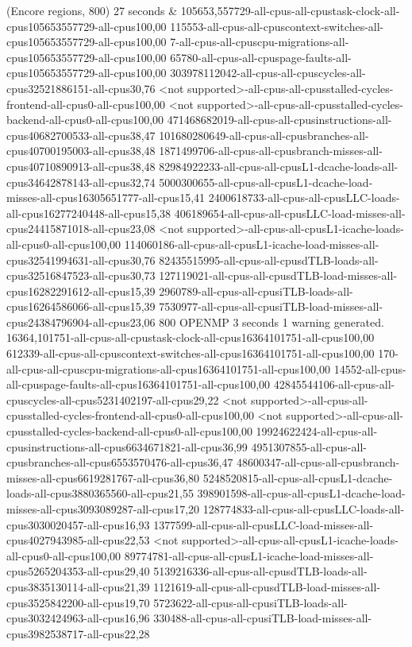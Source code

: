 (Encore regions, 800) 27 seconds
&
105653,557729-all-cpus-all-cpustask-clock-all-cpus105653557729-all-cpus100,00
115553-all-cpus-all-cpuscontext-switches-all-cpus105653557729-all-cpus100,00
7-all-cpus-all-cpuscpu-migrations-all-cpus105653557729-all-cpus100,00
65780-all-cpus-all-cpuspage-faults-all-cpus105653557729-all-cpus100,00
303978112042-all-cpus-all-cpuscycles-all-cpus32521886151-all-cpus30,76
<not supported>-all-cpus-all-cpusstalled-cycles-frontend-all-cpus0-all-cpus100,00
<not supported>-all-cpus-all-cpusstalled-cycles-backend-all-cpus0-all-cpus100,00
471468682019-all-cpus-all-cpusinstructions-all-cpus40682700533-all-cpus38,47
101680280649-all-cpus-all-cpusbranches-all-cpus40700195003-all-cpus38,48
1871499706-all-cpus-all-cpusbranch-misses-all-cpus40710890913-all-cpus38,48
82984922233-all-cpus-all-cpusL1-dcache-loads-all-cpus34642878143-all-cpus32,74
5000300655-all-cpus-all-cpusL1-dcache-load-misses-all-cpus16305651777-all-cpus15,41
2400618733-all-cpus-all-cpusLLC-loads-all-cpus16277240448-all-cpus15,38
406189654-all-cpus-all-cpusLLC-load-misses-all-cpus24415871018-all-cpus23,08
<not supported>-all-cpus-all-cpusL1-icache-loads-all-cpus0-all-cpus100,00
114060186-all-cpus-all-cpusL1-icache-load-misses-all-cpus32541994631-all-cpus30,76
82435515995-all-cpus-all-cpusdTLB-loads-all-cpus32516847523-all-cpus30,73
127119021-all-cpus-all-cpusdTLB-load-misses-all-cpus16282291612-all-cpus15,39
2960789-all-cpus-all-cpusiTLB-loads-all-cpus16264586066-all-cpus15,39
7530977-all-cpus-all-cpusiTLB-load-misses-all-cpus24384796904-all-cpus23,06
800 OPENMP 3 seconds
1 warning generated.
16364,101751-all-cpus-all-cpustask-clock-all-cpus16364101751-all-cpus100,00
612339-all-cpus-all-cpuscontext-switches-all-cpus16364101751-all-cpus100,00
170-all-cpus-all-cpuscpu-migrations-all-cpus16364101751-all-cpus100,00
14552-all-cpus-all-cpuspage-faults-all-cpus16364101751-all-cpus100,00
42845544106-all-cpus-all-cpuscycles-all-cpus5231402197-all-cpus29,22
<not supported>-all-cpus-all-cpusstalled-cycles-frontend-all-cpus0-all-cpus100,00
<not supported>-all-cpus-all-cpusstalled-cycles-backend-all-cpus0-all-cpus100,00
19924622424-all-cpus-all-cpusinstructions-all-cpus6634671821-all-cpus36,99
4951307855-all-cpus-all-cpusbranches-all-cpus6553570476-all-cpus36,47
48600347-all-cpus-all-cpusbranch-misses-all-cpus6619281767-all-cpus36,80
5248520815-all-cpus-all-cpusL1-dcache-loads-all-cpus3880365560-all-cpus21,55
398901598-all-cpus-all-cpusL1-dcache-load-misses-all-cpus3093089287-all-cpus17,20
128774833-all-cpus-all-cpusLLC-loads-all-cpus3030020457-all-cpus16,93
1377599-all-cpus-all-cpusLLC-load-misses-all-cpus4027943985-all-cpus22,53
<not supported>-all-cpus-all-cpusL1-icache-loads-all-cpus0-all-cpus100,00
89774781-all-cpus-all-cpusL1-icache-load-misses-all-cpus5265204353-all-cpus29,40
5139216336-all-cpus-all-cpusdTLB-loads-all-cpus3835130114-all-cpus21,39
1121619-all-cpus-all-cpusdTLB-load-misses-all-cpus3525842200-all-cpus19,70
5723622-all-cpus-all-cpusiTLB-loads-all-cpus3032424963-all-cpus16,96
330488-all-cpus-all-cpusiTLB-load-misses-all-cpus3982538717-all-cpus22,28

